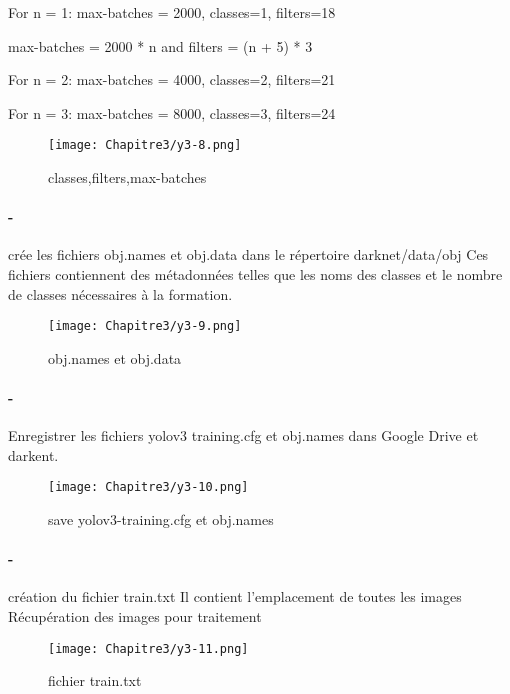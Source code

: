       For n = 1: max-batches = 2000, classes=1, filters=18 

      max-batches = 2000 * n and filters = (n + 5) * 3 

      For n = 2: max-batches = 4000, classes=2, filters=21

      For n = 3: max-batches = 8000, classes=3, filters=24
      \begin{figure}[H]
           \centering
           \texttt{[image: Chapitre3/y3-8.png]}
           \caption{classes,filters,max-batches }
           \label{y3-8}
           \end{figure} 


      \paragraph{-}  crée les fichiers obj.names et obj.data dans le répertoire darknet/data/obj
      Ces fichiers contiennent des métadonnées telles que les noms des classes et le nombre de classes nécessaires à la formation.       
      \begin{figure}[H]
           \centering
           \texttt{[image: Chapitre3/y3-9.png]}
           \caption{obj.names et obj.data}
           \label{y3-9}
           \end{figure} 

      \paragraph{-} Enregistrer les fichiers yolov3 training.cfg et  obj.names dans Google Drive et darkent.
      \begin{figure}[H]
           \centering
           \texttt{[image: Chapitre3/y3-10.png]}
           \caption{save yolov3-training.cfg et obj.names }
           \label{y3-10}
           \end{figure} 

      \paragraph{-} création du fichier train.txt  
      Il contient l'emplacement de toutes les images  
      Récupération des images pour traitement
      \begin{figure}[H]
           \centering
           \texttt{[image: Chapitre3/y3-11.png]}
           \caption{ fichier train.txt }
           \label{y3-11}
           \end{figure}

